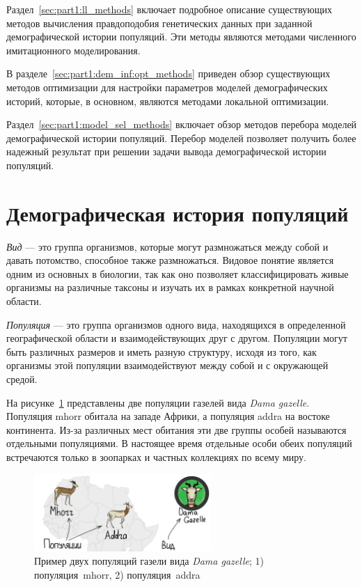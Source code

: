 Раздел~\ref{sec:part1:ll_methods} включает подробное описание существующих методов вычисления правдоподобия генетических данных при заданной демографической истории популяций.
Эти методы являются методами численного имитационного моделирования.

В разделе~\ref{sec:part1:dem_inf:opt_methods} приведен обзор существующих методов оптимизации для настройки параметров моделей демографических историй, которые, в основном, являются методами локальной оптимизации.

Раздел~\ref{sec:part1:model_sel_methods} включает обзор методов перебора моделей демографической истории популяций.
Перебор моделей позволяет получить более надежный результат при решении задачи вывода демографической истории популяций.



\section{Демографическая история популяций}
\label{sec:part1:dem_his}

\emph{Вид} --- это группа организмов, которые могут размножаться между собой и давать потомство, способное также размножаться. Видовое понятие является одним из основных в биологии, так как оно позволяет классифицировать живые организмы на различные таксоны и изучать их в рамках конкретной научной области.

\emph{Популяция} --- это группа организмов одного вида, находящихся в определенной географической области и взаимодействующих друг с другом. Популяции могут быть различных размеров и иметь разную структуру, исходя из того, как организмы этой популяции взаимодействуют между собой и с окружающей средой.

На рисунке~\ref{fig:part1:bio:dama_gazelle_map} представлены две популяции газелей вида \textit{Dama gazelle}.
Популяция mhorr обитала на западе Африки, а популяция addra на востоке континента.
Из-за различных мест обитания эти две группы особей называются отдельными популяциями.
В настоящее время отдельные особи обеих популяций встречаются только в зоопарках и частных коллекциях по всему миру.

\begin{figure}[ht]
    \centering
    \includegraphics[width=0.6\textwidth]{images/part1/biology/world.pdf}
    \caption{Пример двух популяций газели вида \textit{Dama gazelle}; 1) популяция~mhorr, 2) популяция~addra}
    \label{fig:part1:bio:dama_gazelle_map}
\end{figure}

